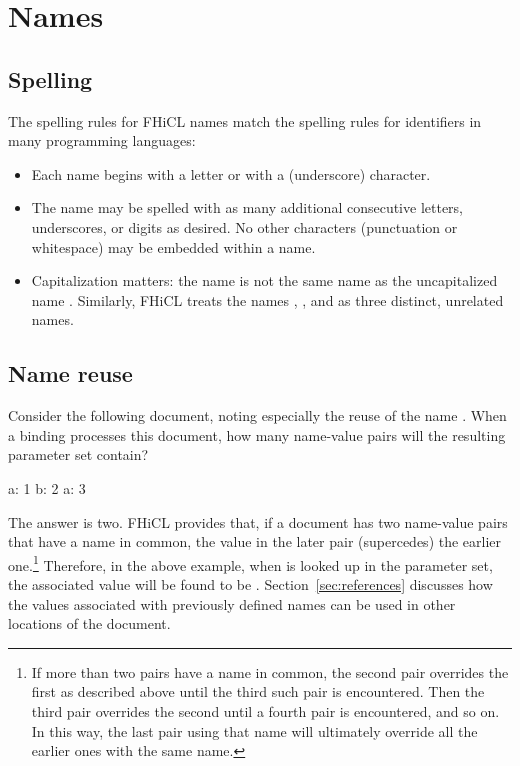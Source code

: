 \documentclass{memarticle}
\newcommand{\fhicl}{FHiCL\xspace}
\begin{document}
\chapter{Names}

\section{Spelling}

The spelling rules for \fhicl names match the spelling rules for
identifiers in many programming languages:
\begin{itemize}
\item Each name begins with a letter or with a \fclcode{_}
  (underscore) character.
\item The name may be spelled with as many additional consecutive
  letters, underscores, or digits as desired.  No other characters
  (\eg punctuation or whitespace) may be embedded within a name.
\item Capitalization matters: the name  is not the same
  name as the uncapitalized name .  Similarly, \fhicl
  treats the names , , and
   as three distinct, unrelated names.
\end{itemize}%

\section{Name reuse}

Consider the following document, noting especially the reuse of the
name .  When a binding processes this document, how many
name-value pairs will the resulting parameter set contain?
%
\Needspace{0.5in}
\begin{fcllisting}[texcl,escapechar=`]
a: 1
b: 2
a: 3
\end{fcllisting}
%
The answer is two.  \fhicl provides that, if a document has two
name-value pairs that have a name in common, the value in the later
pair  (supercedes) the earlier one.\footnote{%
  If more than two pairs have a name in common, the second pair
  overrides the first as described above until the third such pair is
  encountered.  Then the third pair overrides the second until a
  fourth pair is encountered, and so on.  In this way, the last pair
  using that name will ultimately override all the earlier ones with
  the same name.%
} Therefore, in the above example, when  is looked up in
the parameter set, the associated value will be found to be
.  Section~\ref{sec:references} discusses how the values
associated with previously defined names can be used in other
locations of the document.
\end{document}
